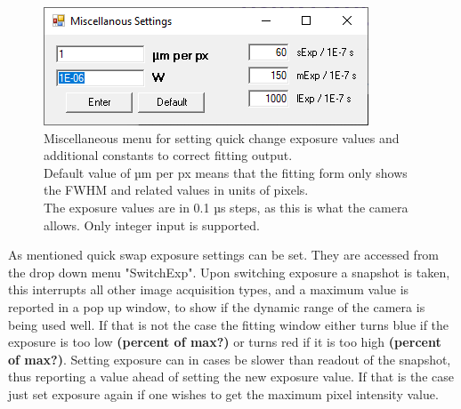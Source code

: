 \documentclass[twoside,openright]{scrreprt}
\begin{document}
\begin{figure}[hbtp]
\centering
\includegraphics[scale=1]{images/ArtrayExamplePics/DefaultMiscSettings.PNG}
\caption{Miscellaneous menu for setting quick change exposure values and additional constants to correct fitting output.\\
Default value of µm per px means that the fitting form only shows the FWHM and related values in units of pixels.\\
The exposure values are in 0.1 µs steps, as this is what the camera allows. Only integer input is supported.}
\end{figure}



As mentioned quick swap exposure settings can be set. They are accessed from the drop down menu "SwitchExp". Upon switching exposure a snapshot is taken, this interrupts all other image acquisition types, and a maximum value is reported in a pop up window, to show if the dynamic range of the camera is being used well. If that is not the case the fitting window either turns blue if the exposure is too low \textbf{(percent of max?)} or turns red if it is too high \textbf{(percent of max?)}. Setting exposure can in cases be slower than readout of the snapshot, thus reporting a value ahead of setting the new exposure value. If that is the case just set exposure again if one wishes to get the maximum pixel intensity value.\\
\end{document}
